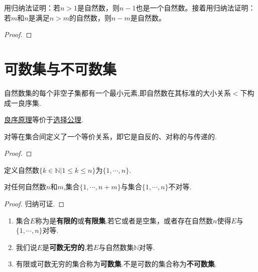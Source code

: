 \documentclass[lang=cn,newtx,10pt,scheme=chinese]{elegantbook}
\begin{document}
\begin{example}\label{example-9}
用归纳法证明：若\(n > 1\)是自然数，则\(n - 1\)也是一个自然数。接着用归纳法证明：若\(m\)和\(n\)是满足\(n>m\)的自然数，则\(n - m\)是自然数。
\end{example}
\begin{proof}
  
\end{proof}





\section{可数集与不可数集}

\begin{axiom}[良序原理]\label{theorem:良序原理}
  自然数集的每个非空子集都有一个最小元素,即自然数在其标准的大小关系$<$下构成一良序集.
\end{axiom}
\begin{note}
  \hyperref[theorem:良序原理]{良序原理}等价于\hyperref[axiom:Zermelo选择公理]{选择公理}.
\end{note}

\begin{proposition}\label{proposition:集合之间的对等是一个等价关系}
  对等在集合间定义了一个等价关系，即它是自反的、对称的与传递的.
\end{proposition}
\begin{proof}
  
\end{proof}

\begin{definition}[自然数]\label{definition:自然数}
  定义自然数\(\{k\in\mathbb{N}|1\leqslant k\leqslant n\}\)为\(\{1, \cdots, n\}\).
\end{definition}

\begin{theorem}[鸽笼原理]\label{theorem:鸽笼原理}
  对任何自然数\(n\)和\(m\),集合\(\{1, \cdots, n + m\}\)与集合\(\{1, \cdots, n\}\)不对等.
\end{theorem}
\begin{proof}
  归纳可证.
\end{proof}

\begin{definition}[可数集与不可数集]\label{definition:可数集与不可数集}
\begin{enumerate}
  \item 集合\(E\)称为是\textbf{有限的}或\textbf{有限集}.若它或者是空集，或者存在自然数\(n\)使得\(E\)与\(\{1, \cdots, n\}\)对等.
  \item 我们说\(E\)是\textbf{可数无穷的},若\(E\)与自然数集\(\mathbb{N}\)对等.
  \item 有限或可数无穷的集合称为\textbf{可数集}.不是可数的集合称为\textbf{不可数集}.
\end{enumerate}
\end{definition}
\end{document}
